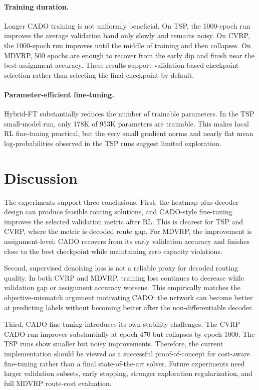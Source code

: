 \paragraph{Training duration.}
Longer CADO training is not uniformly beneficial. On TSP, the 1000-epoch run improves the average validation band only slowly and remains noisy. On CVRP, the 1000-epoch run improves until the middle of training and then collapses. On MDVRP, 500 epochs are enough to recover from the early dip and finish near the best assignment accuracy. These results support validation-based checkpoint selection rather than selecting the final checkpoint by default.

\paragraph{Parameter-efficient fine-tuning.}
Hybrid-FT substantially reduces the number of trainable parameters. In the TSP small-model run, only 178K of 953K parameters are trainable. This makes local RL fine-tuning practical, but the very small gradient norms and nearly flat mean log-probabilities observed in the TSP runs suggest limited exploration.

\section{Discussion}
\label{sec:discussion}

The experiments support three conclusions. First, the heatmap-plus-decoder design can produce
feasible routing solutions, and CADO-style fine-tuning improves the selected validation metric
after RL. This is clearest for TSP and CVRP, where the metric is decoded route gap. For MDVRP,
the improvement is assignment-level: CADO recovers from its early validation accuracy and
finishes close to the best checkpoint while maintaining zero capacity violations.

Second, supervised denoising loss is not a reliable proxy for decoded routing quality. In both CVRP and MDVRP, training loss continues to decrease while validation gap or assignment accuracy worsens. This empirically matches the objective-mismatch argument motivating CADO: the network can become better at predicting labels without becoming better after the non-differentiable decoder.

Third, CADO fine-tuning introduces its own stability challenges. The CVRP CADO run improves substantially at epoch 470 but collapses by epoch 1000. The TSP runs show smaller but noisy improvements. Therefore, the current implementation should be viewed as a successful proof-of-concept for cost-aware fine-tuning rather than a final state-of-the-art solver. Future experiments need larger validation subsets, early stopping, stronger exploration regularization, and full MDVRP route-cost evaluation.
